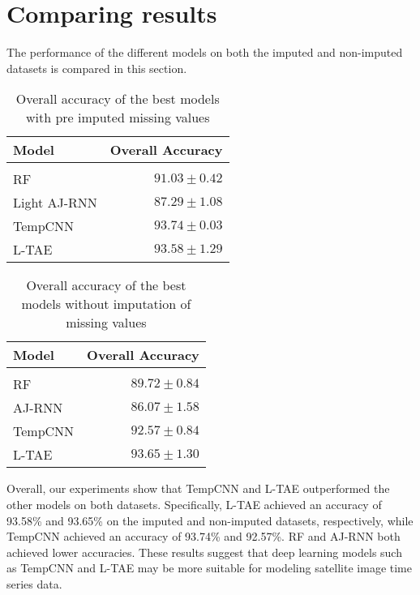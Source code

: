 




\section{Comparing results}

The performance of the different models on both the imputed and non-imputed datasets is compared in this section.

\begin{table}[H]
  \centering
    \begin{tabular}{lr}
    Model                       & Overall Accuracy             \\[0.2cm] 
    \hline \\[-0.2cm]
    RF            & $91.03 \pm 0.42$\\
    Light AJ-RNN  & $87.29 \pm 1.08$\\
    TempCNN       & $93.74 \pm 0.03$\\
    L-TAE         & $93.58 \pm 1.29$
    \end{tabular}
  \caption{Overall accuracy of the best models with pre imputed missing values}
  \label{tab:ALLresultsImputed} 
\end{table}

\begin{table}[H]
  \centering
    \begin{tabular}{lr}
    Model                       & Overall Accuracy             \\[0.2cm] 
    \hline \\[-0.2cm]
    RF      & $89.72 \pm 0.84$\\
    AJ-RNN  & $86.07 \pm 1.58$\\
    TempCNN & $92.57 \pm 0.84$\\
    L-TAE   & $93.65 \pm 1.30$
    \end{tabular}
  \caption{Overall accuracy of the best models without imputation of missing values} 
  \label{tab:ALLresultsNoImputed}
\end{table}

Overall, our experiments show that TempCNN and L-TAE outperformed the other models on both datasets.
Specifically, L-TAE achieved an accuracy of 93.58\% and 93.65\% on the imputed and non-imputed datasets, respectively, 
while TempCNN achieved an accuracy of 93.74\% and 92.57\%. RF and AJ-RNN both achieved lower accuracies. 
These results suggest that deep learning models such as TempCNN and L-TAE may be more suitable for modeling satellite image time series data.

